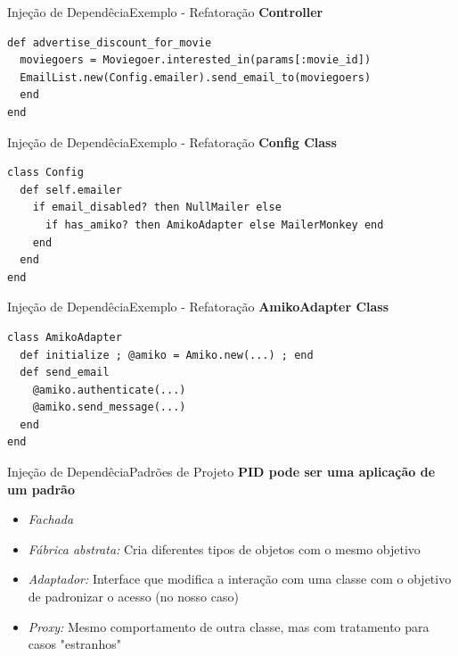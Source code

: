 \documentclass[10pt]{beamer}
\begin{document}

\begin{frame}[fragile]{Injeção de Dependêcia}{Exemplo - Refatoração}
  \textbf{Controller}
  \begin{lstlisting}
def advertise_discount_for_movie
  moviegoers = Moviegoer.interested_in(params[:movie_id])
  EmailList.new(Config.emailer).send_email_to(moviegoers)
  end
end
\end{lstlisting}
\end{frame}


\begin{frame}[fragile]{Injeção de Dependêcia}{Exemplo - Refatoração}
  \textbf{Config Class}
  \begin{lstlisting}
class Config
  def self.emailer
    if email_disabled? then NullMailer else
      if has_amiko? then AmikoAdapter else MailerMonkey end
    end
  end
end
\end{lstlisting}
\end{frame}


\begin{frame}[fragile]{Injeção de Dependêcia}{Exemplo - Refatoração}
  \textbf{AmikoAdapter Class}
  \begin{lstlisting}
class AmikoAdapter
  def initialize ; @amiko = Amiko.new(...) ; end
  def send_email
    @amiko.authenticate(...)
    @amiko.send_message(...)
  end
end
\end{lstlisting}
\end{frame}




\begin{frame}{Injeção de Dependêcia}{Padrões de Projeto}
	\textbf{PID pode ser uma aplicação de um padrão}
    \begin{itemize}
	\item \textit{Fachada}
    \item \textit{Fábrica abstrata:} Cria diferentes tipos de objetos com o mesmo objetivo  
    \item \textit{Adaptador:} Interface que modifica a interação com uma classe com o objetivo de padronizar o acesso (no nosso caso)
    \item \textit{Proxy:} Mesmo comportamento de outra classe, mas com tratamento para casos "estranhos"
	\end{itemize}
\end{frame}
\end{document}
